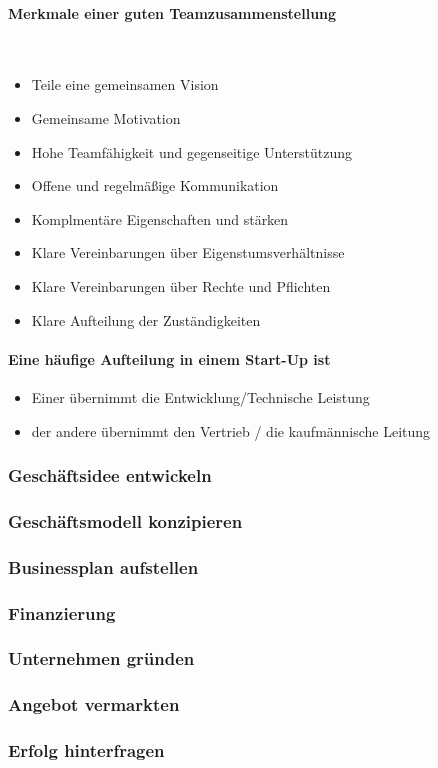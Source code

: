             \paragraph{Merkmale einer guten Teamzusammenstellung}~\\
            \begin{itemize}
                \item Teile eine gemeinsamen Vision
                \item Gemeinsame Motivation
                \item Hohe Teamfähigkeit und gegenseitige Unterstützung
                \item Offene und regelmäßige Kommunikation
                \item Komplmentäre Eigenschaften und stärken
                \item Klare Vereinbarungen über Eigenstumsverhältnisse
                \item Klare Vereinbarungen über Rechte und Pflichten
                \item Klare Aufteilung der Zuständigkeiten
            \end{itemize}

            \paragraph{Eine häufige Aufteilung in einem Start-Up ist}
            \begin{itemize}
                \item Einer übernimmt die Entwicklung/Technische Leistung
                \item der andere übernimmt den Vertrieb / die kaufmännische Leitung
            \end{itemize}
        \subsubsection{Geschäftsidee entwickeln}
        \subsubsection{Geschäftsmodell konzipieren}
        \subsubsection{Businessplan aufstellen}
        \subsubsection{Finanzierung}
        \subsubsection{Unternehmen gründen}
        \subsubsection{Angebot vermarkten}
        \subsubsection{Erfolg hinterfragen}

    